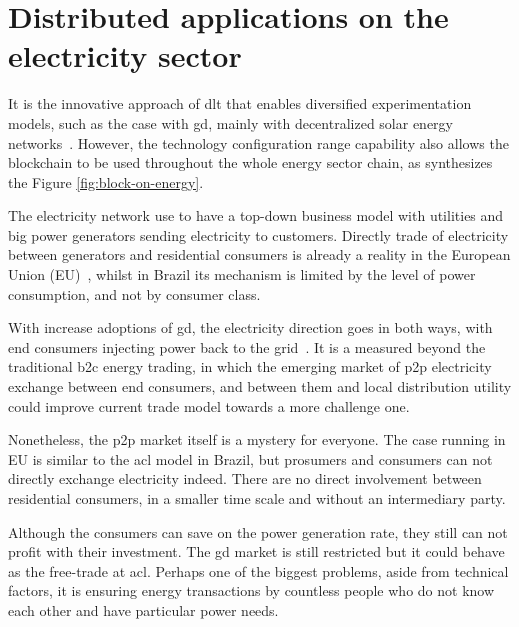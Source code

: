 \section{Distributed applications on the electricity sector~\label{sec:blockchain}}

It is the innovative approach of \acrshort{dlt} that enables diversified experimentation models,
such as the case with \acrshort{gd}, mainly with decentralized solar energy networks~\cite{its3}.
However, the technology configuration range capability also allows the blockchain to be used throughout the whole energy sector chain, as synthesizes the Figure \ref{fig:block-on-energy}.

The electricity network use to have a top-down business model with utilities and big power generators sending electricity to customers.
Directly trade of electricity between generators and residential consumers is already a reality in the European Union (EU)~\cite{blocktrading,Brasil-futuroEE},
whilst in Brazil its mechanism is limited by the level of power consumption, and not by consumer class.

With increase adoptions of \acrshort{gd}, the electricity direction goes in both ways, with end consumers injecting power back to the grid~\cite{peck2017}.
It is a measured beyond the traditional \acrfull{b2c} energy trading,
in which the emerging market of \acrshort{p2p} electricity exchange between end consumers,
and between them and local distribution utility could improve current trade model towards a more challenge one.

Nonetheless, the \acrshort{p2p} market itself is a mystery for everyone.
The case running in EU is similar to the \acrshort{acl} model in Brazil, but prosumers and consumers can not directly exchange electricity indeed.
There are no direct involvement between residential consumers, in a smaller time scale and without an intermediary party.

Although the consumers can save on the power generation rate, they still can not profit with their investment.
The \acrshort{gd} market is still restricted but it could behave as the free-trade at \acrshort{acl}.
Perhaps one of the biggest problems, aside from technical factors,
it is ensuring energy transactions by countless people who do not know each other and have particular power needs.

